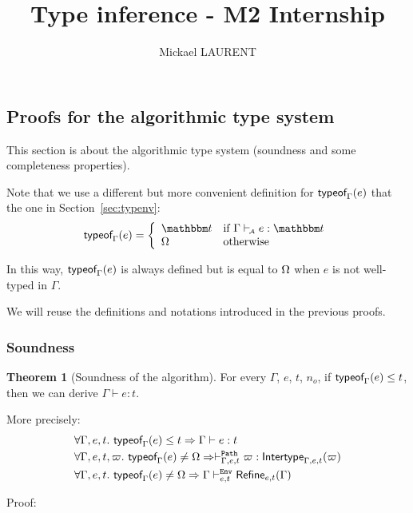 \documentclass[a4paper]{article}
\title{\vspace{1.5cm}Type inference - M2 Internship}
\author{Mickael LAURENT}
\date{\vspace{-5ex}}
\theoremstyle{definition}
\newtheorem{theorem}{Theorem}
\begin{document}
  \maketitle

  \subsection{Proofs for the algorithmic type system}

  This section is about the algorithmic type system (soundness and some completeness properties).

  Note that we use a different but more convenient definition for $\textsf{typeof}_{\Gamma}(e)$ that the one
  in Section~\ref{sec:typenv}:
  \begin{align*}
    \tyof e \Gamma = 
    \left\{\begin{array}{ll}
      \ts & \text{if } \Gamma \vdashA e:\ts \\
      \tsempty & \text{otherwise}
    \end{array}\right.
  \end{align*}

  In this way, $\textsf{typeof}_{\Gamma}(e)$ is always defined but is equal to $\Omega$ when $e$ is not
  well-typed in $\Gamma$. 

  We will reuse the definitions and notations introduced in the previous proofs.

  \subsubsection{Soundness}

  \begin{theorem}[Soundness of the algorithm]
    For every $\Gamma$, $e$, $t$, $n_o$, if $\textsf{typeof}_{\Gamma}(e) \leq t$, then we can derive $\Gamma \vdash e:t$.

    More precisely:
    \begin{align*}
      &\forall \Gamma, e, t.\ \textsf{typeof}_{\Gamma}(e) \leq t \Rightarrow \Gamma \vdash e:t\\
      &\forall \Gamma, e, t, \varpi.\ \textsf{typeof}_{\Gamma}(e) \neq \Omega \Rightarrow \vdash^{\texttt{Path}}_{\Gamma,e,t} \varpi:\textsf{Intertype}_{\Gamma,e,t} (\varpi)\\
      &\forall \Gamma, e, t.\ \textsf{typeof}_{\Gamma}(e) \neq \Omega \Rightarrow \Gamma \vdash^{\texttt{Env}}_{e,t} \textsf{Refine}_{e,t}(\Gamma)
    \end{align*}
  \end{theorem}

  Proof:
\end{document}
